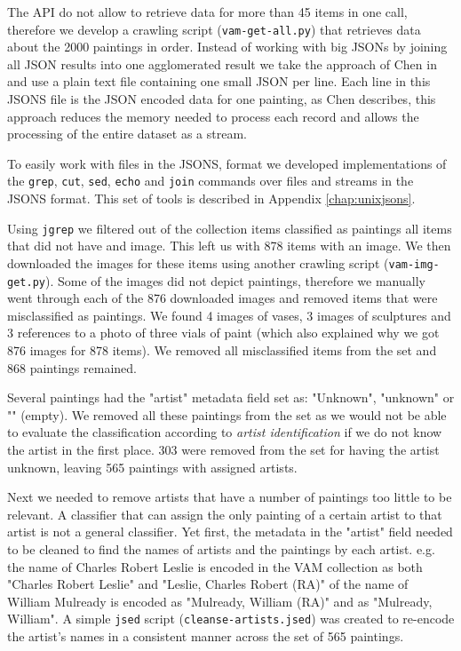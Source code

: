 \documentclass[11pt,a4paper,draft]{report}
\begin{document}
\begin{multicols}{2}
The API do not allow to retrieve data for more than 45 items in one call,
therefore we develop a crawling script (\texttt{vam-get-all.py}) that retrieves
data about the 2000 paintings in order.  Instead of working with big JSONs by
joining all JSON results into one agglomerated result we take the approach of
Chen in \cite{chen09yahoo} and use a plain text file containing one small JSON
per line.  Each line in this JSONS file is the JSON encoded data for one
painting, as Chen \cite{chen09yahoo} describes, this approach reduces the
memory needed to process each record and allows the processing of the entire
dataset as a stream.

To easily work with files in the JSONS, format we developed implementations of
the \texttt{grep}, \texttt{cut}, \texttt{sed}, \texttt{echo} and \texttt{join}
commands over files and streams in the JSONS format.  This set of tools is
described in Appendix \ref{chap:unixjsons}.

Using \texttt{jgrep} we filtered out of the collection items classified as
paintings all items that did not have and image.  This left us with 878 items
with an image.  We then downloaded the images for these items using another
crawling script (\texttt{vam-img-get.py}).  Some of the images did not depict
paintings, therefore we manually went through each of the 876 downloaded images
and removed items that were misclassified as paintings.  We found 4 images of
vases, 3 images of sculptures and 3 references to a photo of three vials of
paint (which also explained why we got 876 images for 878 items).  We removed
all misclassified items from the set and 868 paintings remained.

Several paintings had the "artist" metadata field set as: "Unknown", "unknown"
or "" (empty).  We removed all these paintings from the set as we would not be
able to evaluate the classification according to \emph{artist identification}
if we do not know the artist in the first place.  303 were removed from the set
for having the artist unknown, leaving 565 paintings with assigned artists.

Next we needed to remove artists that have a number of paintings too little to
be relevant.  A classifier that can assign the only painting of a certain
artist to that artist is not a general classifier.  Yet first, the metadata in
the "artist" field needed to be cleaned to find the names of artists and the
paintings by each artist.  e.g. the name of Charles Robert Leslie is encoded in
the VAM collection as both "Charles Robert Leslie" and "Leslie, Charles Robert
(RA)" of the name of William Mulready is encoded as "Mulready, William (RA)"
and as "Mulready, William".  A simple \texttt{jsed} script
(\texttt{cleanse-artists.jsed}) was created to re-encode the artist's names in
a consistent manner across the set of 565 paintings.


\end{multicols}
\end{document}
